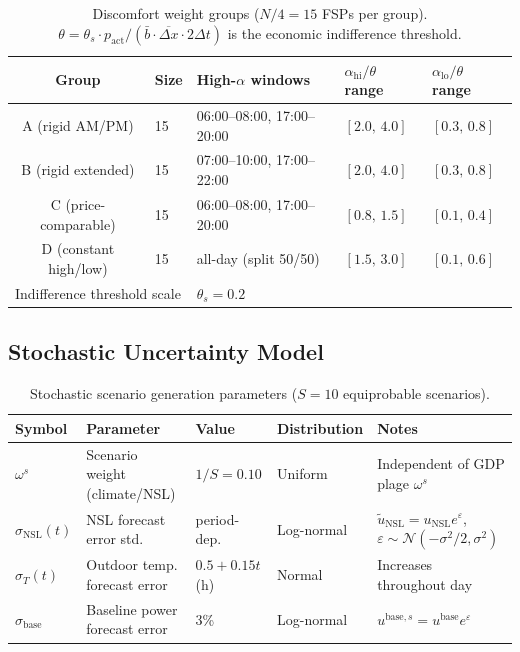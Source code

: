 \begin{table}[htbp]
\centering
\caption{Discomfort weight groups ($N/4 = 15$ FSPs per group).
$\theta = \theta_s \cdot p_\text{act} / (\bar{b} \cdot \overline{\Delta x} \cdot 2\Delta t)$
is the economic indifference threshold.}
\label{tab:groups}
\begin{tabular}{cllll}
\toprule
Group & Size & High-$\alpha$ windows & $\alpha_\text{hi}/\theta$ range & $\alpha_\text{lo}/\theta$ range \\
\midrule
A (rigid AM/PM)        & 15 & 06:00–08:00, 17:00–20:00 & $[2.0,\,4.0]$ & $[0.3,\,0.8]$ \\
B (rigid extended)     & 15 & 07:00–10:00, 17:00–22:00 & $[2.0,\,4.0]$ & $[0.3,\,0.8]$ \\
C (price-comparable)   & 15 & 06:00–08:00, 17:00–20:00 & $[0.8,\,1.5]$ & $[0.1,\,0.4]$ \\
D (constant high/low)  & 15 & all-day (split 50/50)    & $[1.5,\,3.0]$ & $[0.1,\,0.6]$ \\
\midrule
\multicolumn{2}{l}{Indifference threshold scale} & $\theta_s = 0.2$ & & \\
\bottomrule
\end{tabular}
\end{table}

\subsection*{Stochastic Uncertainty Model}

\begin{table}[htbp]
\centering
\caption{Stochastic scenario generation parameters ($S=10$ equiprobable scenarios).}
\label{tab:stochastic}
\begin{tabular}{lllll}
\toprule
Symbol & Parameter & Value & Distribution & Notes \\
\midrule
$\omega^s$         & Scenario weight (climate/NSL)  & $1/S = 0.10$ & Uniform     & Independent of GDP plage $\omega^s$ \\
$\sigma_\text{NSL}(t)$ & NSL forecast error std.   & period-dep.  & Log-normal  & $\tilde{u}_\text{NSL} = u_\text{NSL} e^{\varepsilon}$, $\varepsilon \sim \mathcal{N}(-\sigma^2/2, \sigma^2)$ \\
$\sigma_T(t)$      & Outdoor temp. forecast error  & $0.5 + 0.15t$ (h) & Normal & Increases throughout day \\
$\sigma_\text{base}$ & Baseline power forecast error & 3\%          & Log-normal  & $u^{\text{base},s} = u^\text{base} e^\varepsilon$ \\
\bottomrule
\end{tabular}
\end{table}

